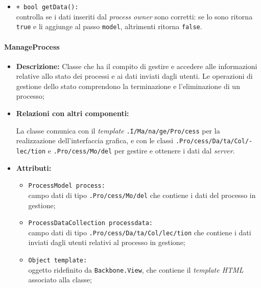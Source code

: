 \begin{flushleft}
\begin{itemize}
\begin{sloppypar}
\begin{itemize}
\item \texttt{+ bool getData():}\\ controlla se i dati inseriti dal \textit{process owner} sono corretti: se lo sono ritorna \texttt{true} e li aggiunge al passo \texttt{model}, altrimenti ritorna \texttt{false}.
\end{itemize}
\end{sloppypar}
\end{itemize}
\end{flushleft}

\paragraph{ManageProcess}
\label{manageProcess}
\begin{flushleft}
\begin{itemize}
\item \textbf{Descrizione:} Classe che ha il compito di gestire e accedere alle informazioni relative allo stato dei processi e ai dati inviati dagli utenti. Le operazioni di gestione dello stato comprendono la terminazione e l'eliminazione di un processo;
\item \textbf{Relazioni con altri componenti:}
\begin{sloppypar}
La classe comunica con il \textit{template} \texttt{\viewAdmin{}.I\fshyp{}Ma\fshyp{}na\fshyp{}ge\fshyp{}Pro\fshyp{}cess} per la realizzazione dell'interfaccia grafica, e con le classi \texttt{\collection{}.Pro\fshyp{}cess\fshyp{}Da\fshyp{}ta\fshyp{}Col\fshyp{}lec\fshyp{}tion} e \texttt{\model{}.Pro\fshyp{}cess\fshyp{}Mo\fshyp{}del} per gestire e ottenere i dati dal \textit{server}.
\end{sloppypar}
\item \textbf{Attributi:}
\begin{sloppypar}
\begin{itemize}
\item \texttt{ProcessModel process:}\\ campo dati di tipo \texttt{\model{}.Pro\fshyp{}cess\fshyp{}Mo\fshyp{}del} che contiene i dati del processo in gestione;
\item \texttt{ProcessDataCollection processdata:}\\ campo dati di tipo \texttt{\collection{}.Pro\fshyp{}cess\fshyp{}Da\fshyp{}ta\fshyp{}Col\fshyp{}lec\fshyp{}tion} che contiene i dati inviati dagli utenti relativi al processo in gestione;
\item \texttt{Object template:}\\ oggetto ridefinito da \texttt{Backbone.View}, che contiene il \textit{template HTML} associato alla classe;

\end{itemize}
\end{sloppypar}
\end{itemize}
\end{flushleft}

